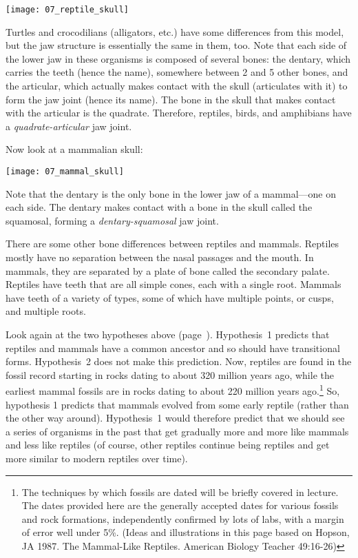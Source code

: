 \documentclass[12pt, hidelinks]{exam}
\begin{document}
\begin{questions}
\begin{center}\texttt{[image: 07\_reptile\_skull]}\end{center}

Turtles and crocodilians (alligators, etc.) have some differences from this model, but the jaw structure is essentially the same in them, too.  Note that each side of the lower jaw in these organisms is composed of several bones:  the dentary, which carries the teeth (hence the name), somewhere between 2 and 5 other bones, and the articular, which actually makes contact with the skull (articulates with it) to form the jaw joint (hence its name).  The bone in the skull that makes contact with the articular is the quadrate.  Therefore, reptiles, birds, and amphibians have a \emph{quadrate-articular} jaw joint.  

Now look at a mammalian skull:

	\begin{center}\texttt{[image: 07\_mammal\_skull]} \end{center}
	
Note that the dentary is the only bone in the lower jaw of a mammal—one on each side.  The dentary makes contact with a bone in the skull called the squamosal, forming a \emph{dentary-squamosal} jaw joint. 

There are some other bone differences between reptiles and mammals.  Reptiles mostly have no separation between the nasal passages and the mouth.  In mammals, they are separated by a plate of bone called the secondary palate.  Reptiles have teeth that are all simple cones, each with a single root.  Mammals have teeth of a variety of types, some of which have multiple points, or cusps, and multiple roots.  

Look again at the two hypotheses above (page~\pageref{hypothesis1}). Hypothesis~1 predicts that reptiles and mammals have a common ancestor and so should have transitional forms. Hypothesis~2 does not make this prediction. Now, reptiles are found in the fossil record starting in rocks dating to about 320 million years ago, while the earliest mammal fossils are in rocks dating to about 220 million years ago.\footnote{The techniques by which fossils are dated will be briefly covered in lecture. The dates provided here are the generally accepted dates for various fossils and rock formations, independently confirmed by lots of labs, with a margin of error well under 5\%.  (Ideas and illustrations in this page based on Hopson, JA 1987.  The Mammal-Like Reptiles.  American Biology Teacher 49:16-26)}  So, hypothesis 1 predicts that mammals evolved from some early reptile (rather than the other way around). Hypothesis~1 would therefore predict that we should see a series of organisms in the past that get gradually more and more like mammals and less like reptiles (of course, other reptiles continue being reptiles and get more similar to modern reptiles over time).  


\end{questions}
\end{document}
